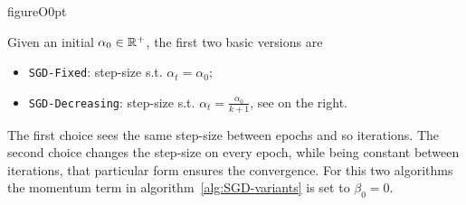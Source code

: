\begin{wrapfloat}{figure}{O}{0pt}
\end{wrapfloat}

Given an initial $\alpha_0\in\mathbb{R}^+$, the first two basic versions are 
\begin{itemize}
\item \texttt{SGD-Fixed}: step-size s.t. $\alpha_t=\alpha_0$;
\item \texttt{SGD-Decreasing}: step-size s.t. $\alpha_t=\frac{\alpha_0}{k+1}$, see on the right.
\end{itemize}
The first choice sees the same step-size between epochs and so iterations. The second choice changes the step-size on every epoch, while being constant between iterations, that particular form ensures the convergence. For this two algorithms the momentum term in algorithm~\ref{alg:SGD-variants} is set to $\beta_0=0$.


